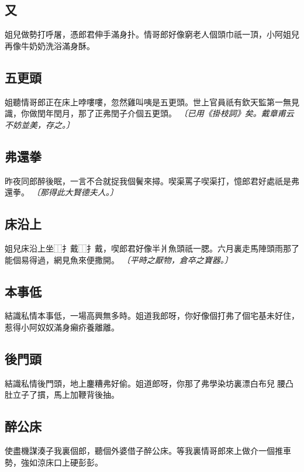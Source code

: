\subsection*{又}

姐兒做勢打呼屠，憑郎君伸手滿身扑。情哥郎好像窮老人個頭巾祇一頂，小阿姐兒再像牛奶奶洗浴滿身酥。

\subsection*{五更頭}

姐聽情哥郎正在床上哱嘍嘍，忽然雞叫咦是五更頭。世上官員祇有欽天監第一無見識，你做閏年閏月，那了正弗閏子介個五更頭。
\textit{〔已用《掛枝詞》矣。戴章甫云不妨並美，存之。〕}

\subsection*{弗還拳}

昨夜同郎醉後眠，一言不合就捉我個鬢來撏。喫渠罵子喫渠打，憶郎君好處祇是弗還拳。
\textit{〔那得此大賢德夫人。〕}

\subsection*{床沿上}

姐兒床沿上坐⿰扌戴⿰扌戴，喫郎君好像半爿魚頭祇一腮。六月裏走馬陣頭雨那了能個易得過，網見魚來便撒開。
\textit{〔平時之厭物，倉卒之寶器。〕}

\subsection*{本事低}

結識私情本事低，一場高興無多時。姐道我郎呀，你好像個打弗了個宅基未好住，惹得小阿奴奴滿身癩疥養離離。

\subsection*{後門頭}

結識私情後門頭，地上鏖糟弗好偷。姐道郎呀，你那了弗學染坊裏漂白布兒𢶑腰凸肚立子了摜，馬上加鞭背後抽。

\subsection*{醉公床}

使盡機謀湊子我裏個郎，聽個外婆借子醉公床。等我裏情哥郎來上做介一個推車勢，強如涼床口上硬彭彭。

